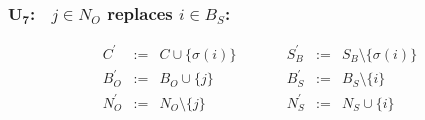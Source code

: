 \documentclass[a4paper]{article}
\begin{document}
\subsubsection{$\mathbf{U_{7}}$:$\quad j \in N_{O}$ replaces $i \in B_{S}$:}
\begin{equation}
\label{update:o_rep_s}
\begin{array}{ccccccc}
C^{\prime}      &:=&  C \cup \{\sigma(i)\}
&\quad\quad&
S_{B}^{\prime}  &:=&  S_{B} \setminus \{\sigma(i)\} \\
B_{O}^{\prime}  &:=&  B_{O} \cup \{j\}
&\quad\quad&
B_{S}^{\prime}  &:=&  B_{S} \setminus \{i\}  \\
N_{O}^{\prime}  &:=&  N_{O} \setminus \{j\}
&\quad\quad&
N_{S}^{\prime}  &:=&  N_{S} \cup \{i\} 
\end{array}
\end{equation}
\end{document}
